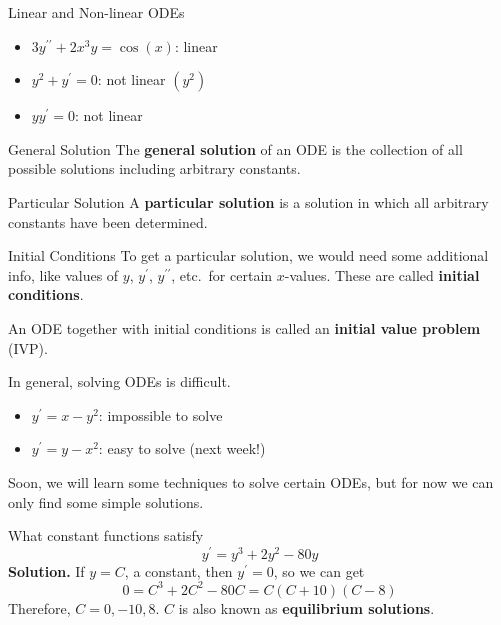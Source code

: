 \begin{Example}{Linear and Non-linear ODEs}{}
    \begin{itemize}
        \item $ 3y^{\prime\prime}+2x^3y=\cos(x) $: linear
        \item $ y^2+y^\prime=0 $: not linear $ (y^2) $
        \item $ yy^\prime=0 $: not linear
    \end{itemize}
\end{Example}

\begin{Definition}{General Solution}{}
    The \textbf{general solution} of an ODE is the collection of all possible
    solutions including arbitrary constants.
\end{Definition}

\begin{Definition}{Particular Solution}{}
    A \textbf{particular solution} is a solution in which all arbitrary constants
    have been determined.
\end{Definition}

\begin{Definition}{Initial Conditions}{}
    To get a particular solution, we would need some additional info, like values of $ y $,
    $ y^\prime $, $ y^{\prime\prime} $, etc.\ for certain $ x $-values. These are
    called \textbf{initial conditions}.
\end{Definition}

An ODE together with initial conditions is called an \textbf{initial value problem} (IVP).

In general, solving ODEs is difficult.
\begin{Example}{}{}
    \begin{itemize}
        \item $ y^{\prime}=x-y^2 $: impossible to solve
        \item $ y^\prime=y-x^2 $: easy to solve (next week!)
    \end{itemize}
\end{Example}

Soon, we will learn some techniques to solve certain ODEs, but for now we can
only find some simple solutions.

\begin{Example}{}{}
    What constant functions satisfy
    \[ y^\prime=y^3+2y^2-80y \]
    \textbf{Solution.} If $ y=C $, a constant, then $ y^\prime=0 $, so we can get
    \[ 0=C^3+2C^2-80C=C(C+10)(C-8) \]
    Therefore, $ C=0,-10,8 $. $ C $ is also known as \textbf{equilibrium solutions}.
\end{Example}

